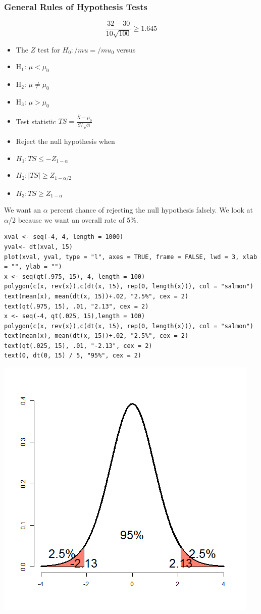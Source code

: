 \documentclass[11pt]{article}
\begin{document}
\subsubsection{General Rules of Hypothesis Tests}
\label{sec-1-1-2}

$$\frac{32-30}{10\sqrt{100}} \ge 1.645$$

\begin{itemize}
\item The $Z$ test for $H_0: /mu = /mu_0$ versus
\item H$_1$: $\mu <\mu_0$
\item H$_2$: $\mu \ne \mu_0$
\item H$_3$: $\mu > \mu_0$
\item Test statistic $TS = \frac{\bar{X} -\mu_0}{S/\sqrt{n}}$
\item Reject the null hypothesis when
\item $H_1 : TS \le -Z_{1-\alpha}$
\item $H_2: |TS| \ge Z_{1-\alpha/2}$
\item $H_3: TS \ge Z_{1-\alpha}$
\end{itemize}

We want an $\alpha$ percent chance of rejecting the null hypothesis
falsely. We look at $\alpha$/2 because we want an overall rate of 5\%.


\begin{verbatim}
xval <- seq(-4, 4, length = 1000)
yval<- dt(xval, 15)
plot(xval, yval, type = "l", axes = TRUE, frame = FALSE, lwd = 3, xlab = "", ylab = "")
x <- seq(qt(.975, 15), 4, length = 100)
polygon(c(x, rev(x)),c(dt(x, 15), rep(0, length(x))), col = "salmon")
text(mean(x), mean(dt(x, 15))+.02, "2.5%", cex = 2)
text(qt(.975, 15), .01, "2.13", cex = 2)
x <- seq(-4, qt(.025, 15),length = 100)
polygon(c(x, rev(x)),c(dt(x, 15), rep(0, length(x))), col = "salmon")
text(mean(x), mean(dt(x, 15))+.02, "2.5%", cex = 2)
text(qt(.025, 15), .01, "-2.13", cex = 2)
text(0, dt(0, 15) / 5, "95%", cex = 2)
\end{verbatim}

\includegraphics[width=.9\linewidth]{figure2.png}
\end{document}
